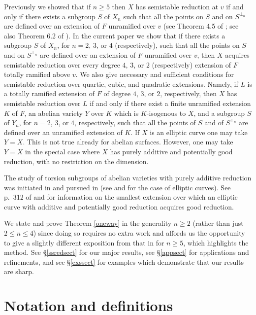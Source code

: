 \documentclass{amsart}
\theoremstyle{definition}
\begin{document}
Previously we showed that if $n \ge 5$
then $X$ has semistable reduction at $v$ if and only if
there exists a subgroup $S$ of $X_n$ such that all the points on
$S$ and on $S^{\perp_n}$ are defined over an extension of $F$
unramified over $v$ (see Theorem 4.5 of \cite{dpp}; 
see also Theorem 6.2 of \cite{semistab}). 
In the current paper we show that if 
there exists a subgroup $S$ of $X_n$, 
for $n = 2$, $3$, or $4$ (respectively),
such that all the points on
$S$ and on $S^{\perp_n}$ are defined over an extension of $F$
unramified over $v$, then $X$ acquires semistable reduction
over every degree $4$, $3$, or $2$ (respectively)
extension of $F$ totally ramified above $v$.
We also give necessary and sufficient conditions for 
semistable reduction over quartic, cubic, and quadratic extensions. 
Namely, if $L$ is a totally ramified extension of $F$ 
of degree $4$, $3$, or $2$, respectively,
then $X$ has semistable reduction over $L$
if and only if there exist a finite unramified
extension $K$ of $F$, an abelian variety $Y$ over $K$ which
is $K$-isogenous to $X$, and a subgroup $S$ of $Y_n$, 
for $n = 2$, $3$, or $4$, respectively, 
such that all the points of $S$ and of $S^{\perp_n}$ are
defined over an unramified extension of $K$.
If $X$ is an elliptic curve one may take $Y = X$. This
is not true already for abelian surfaces. However, one may take 
$Y = X$ in the special case where $X$ has purely additive and
potentially good reduction, with no restriction on the dimension. 

The study of torsion subgroups of 
abelian varieties with purely additive reduction was 
initiated in \cite{LenstraOort}
and pursued in \cite{Lorenzini} (see \cite{Frey} and  
\cite{Flexor-Oesterle} for the case of elliptic curves).
See  p.~312 of \cite{Serre72}
and \cite{Kraus} for information on the smallest extension over
which an elliptic curve with additive and potentially good 
reduction acquires good reduction.

We state and prove Theorem \ref{oneway} in
the generality $n \ge 2$ (rather than just $2 \le n \le 4$) 
since doing so requires no extra work
and affords us the opportunity to give 
a slightly different exposition from 
that in \cite{dpp} for $n \ge 5$, which highlights the
method. See \S\ref{ssredsect} for
our major results, see \S\ref{appsect} for applications and
refinements, and see \S\ref{exssect} for examples which
demonstrate that our results are sharp.

\section{Notation and definitions}
\end{document}

